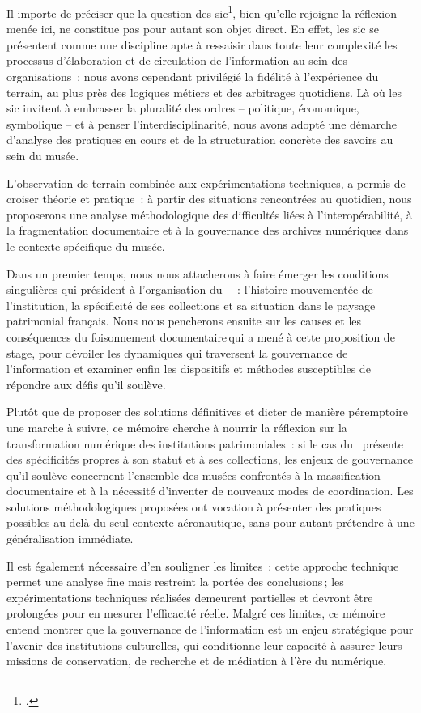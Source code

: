 Il importe de préciser que la question des \acf{sic}\footcite{dacheuxPresentationGeneraleSIC2009}, bien qu'elle rejoigne la réflexion menée ici, ne constitue pas pour autant son objet direct. En effet, les \ac{sic} se présentent comme une discipline apte à ressaisir dans toute leur complexité les processus d’élaboration et de circulation de l’information au sein des organisations~: nous avons cependant privilégié la fidélité à l’expérience du terrain, au plus près des logiques métiers et des arbitrages quotidiens. Là où les \ac{sic} invitent à embrasser la pluralité des ordres – politique, économique, symbolique – et à penser l’interdisciplinarité, nous avons adopté une démarche d'analyse des pratiques en cours et de la structuration concrète des savoirs au sein du musée.

\medskip

L’observation de terrain combinée aux expérimentations techniques, a permis de croiser théorie et pratique~: à partir des situations rencontrées au quotidien, nous proposerons une analyse méthodologique des difficultés liées à l’interopérabilité, à la fragmentation documentaire et à la gouvernance des archives numériques dans le contexte spécifique du musée. 

\bigskip

Dans un premier temps, nous nous attacherons à faire émerger les conditions singulières qui président à l’organisation du \mae~~: l’histoire mouvementée de l’institution, la spécificité de ses collections et sa situation dans le paysage patrimonial français. Nous nous pencherons ensuite sur les causes et les conséquences du foisonnement documentaire qui a mené à cette proposition de stage, pour dévoiler les dynamiques qui traversent la gouvernance de l’information et examiner enfin les dispositifs et méthodes susceptibles de répondre aux défis qu'il soulève.

Plutôt que de proposer des solutions définitives et dicter de manière péremptoire une marche à suivre, ce mémoire cherche à nourrir la réflexion sur la transformation numérique des institutions patrimoniales~: si le cas du \mae~présente des spécificités propres à son statut et à ses collections, les enjeux de gouvernance qu’il soulève concernent l’ensemble des musées confrontés à la massification documentaire et à la nécessité d’inventer de nouveaux modes de coordination. Les solutions méthodologiques proposées ont vocation à présenter des pratiques possibles au-delà du seul contexte aéronautique, sans pour autant prétendre à une généralisation immédiate.

Il est également nécessaire d'en souligner les limites~: cette approche technique permet une analyse fine mais restreint la portée des conclusions ; les expérimentations techniques réalisées demeurent partielles et devront être prolongées pour en mesurer l’efficacité réelle. Malgré ces limites, ce mémoire entend montrer que la gouvernance de l’information est un enjeu stratégique pour l’avenir des institutions culturelles, qui conditionne leur capacité à assurer leurs missions de conservation, de recherche et de médiation à l’ère du numérique.
